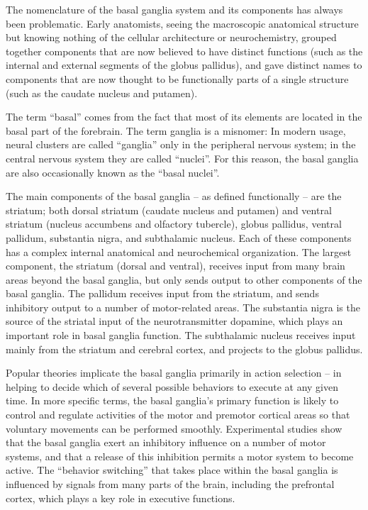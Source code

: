 \documentclass[]{book}
\begin{document}
The nomenclature of the basal ganglia system and its components has always been problematic. Early anatomists, seeing the macroscopic anatomical structure but knowing nothing of the cellular architecture or neurochemistry, grouped together components that are now believed to have distinct functions (such as the internal and external segments of the globus pallidus), and gave distinct names to components that are now thought to be functionally parts of a single structure (such as the caudate nucleus and putamen).

The term ``basal'' comes from the fact that most of its elements are located in the basal part of the forebrain. The term ganglia is a misnomer: In modern usage, neural clusters are called ``ganglia'' only in the peripheral nervous system; in the central nervous system they are called ``nuclei''. For this reason, the basal ganglia are also occasionally known as the ``basal nuclei''.

The main components of the basal ganglia -- as defined functionally -- are the striatum; both dorsal striatum (caudate nucleus and putamen) and ventral striatum (nucleus accumbens and olfactory tubercle), globus pallidus, ventral pallidum, substantia nigra, and subthalamic nucleus. Each of these components has a complex internal anatomical and neurochemical organization. The largest component, the striatum (dorsal and ventral), receives input from many brain areas beyond the basal ganglia, but only sends output to other components of the basal ganglia. The pallidum receives input from the striatum, and sends inhibitory output to a number of motor-related areas. The substantia nigra is the source of the striatal input of the neurotransmitter dopamine, which plays an important role in basal ganglia function. The subthalamic nucleus receives input mainly from the striatum and cerebral cortex, and projects to the globus pallidus.

Popular theories implicate the basal ganglia primarily in action selection -- in helping to decide which of several possible behaviors to execute at any given time. In more specific terms, the basal ganglia's primary function is likely to control and regulate activities of the motor and premotor cortical areas so that voluntary movements can be performed smoothly. Experimental studies show that the basal ganglia exert an inhibitory influence on a number of motor systems, and that a release of this inhibition permits a motor system to become active. The ``behavior switching'' that takes place within the basal ganglia is influenced by signals from many parts of the brain, including the prefrontal cortex, which plays a key role in executive functions.
\end{document}
